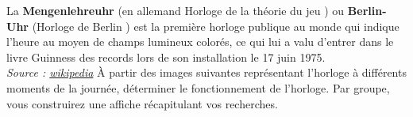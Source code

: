 \begin{enigme}[Mengenlehreuhr]
   \partie[présentation]
      La {\bf Mengenlehreuhr} (en allemand \og Horloge de la théorie du jeu \fg) ou {\bf Berlin-Uhr} (\og Horloge de Berlin \fg) est la première horloge publique au monde qui indique l'heure au moyen de champs lumineux colorés, ce qui lui a valu d'entrer dans le livre Guinness des records lors de son installation le 17 juin 1975. \\
      {\it \small Source : \href{https://en.wikipedia.org/wiki/Mengenlehreuhr}{wikipedia}}
   \partie[recherche]
      À partir des images suivantes représentant l'horloge à différents moments de la journée, déterminer le fonctionnement de l'horloge. Par groupe, vous construirez une affiche récapitulant vos recherches. \\
      \begin{center}
      {
      \begin{minipage}{6cm}
      \end{minipage}
      \hspace{2cm}
      \begin{minipage}{6cm}  
      \end{minipage}
      
      \begin{minipage}{6cm}  
        \scalebox{0.8}{
         \begin{pspicture}(0,-1)(11,15.5)


\end{pspicture}}
\end{minipage}}
\end{center}
\end{enigme}
